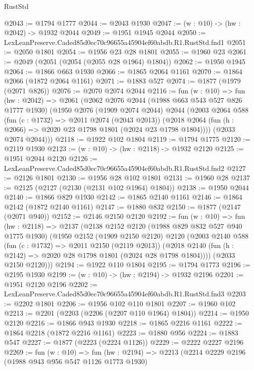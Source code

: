 \begin{lexlean}{RustStd}
\begin{coremodule}
@2043 := @1794 @1777
@2044 := @2043 @1930
@2047 := (w : @10) -> (hw : @2042) -> @1932 @2044
@2049 := @1951 @1945 @2044
@2050 := LexLeanPreserve.Caded85d0ec70c96655a45904ef60abdb.R1.RustStd.fnd1
@2051 := @2050 @1801
@2054 := @1956 @23 @28 @1801
@2055 := @1960 @23
@2061 := @2049 (@2051 (@2054 (@2055 @28 @1964) @1804))
@2062 := @1950 @1945
@2064 := @1866 @663 @1930
@2066 := @1865 @2064 @1161
@2070 := @1864 @2066 (@1872 @2064 @1161)
@2071 := @1883 @527
@2074 := @1877 (@1979 (@2071 @826))
@2076 := @2070 @2074 @2044
@2116 := fun (w : @10) =>
  fun (hw : @2042) =>
  @2061
    (@2062
      @2076
      @2044
      (@1988 @663 @543 @527 @826 @1777 @1930)
      (@1950
        @2076
        (@1909 @2074 @2044)
        @2044
        (@2003
          @2064
          @588
          (fun (c : @1732) => @2011 @2074 (@2043 @2013))
          (@2018 @2064 (fun (h : @2066) => @2020 @23 @1798 @1801 (@2024 @23 @1798 @1804))))
        (@2033 @2074 @2044)))
@2118 := @1922 @102 @1804
@2119 := @1794 @1775
@2120 := @2119 @1930
@2123 := (w : @10) -> (hw : @2118) -> @1932 @2120
@2125 := @1951 @2044 @2120
@2126 := LexLeanPreserve.Caded85d0ec70c96655a45904ef60abdb.R1.RustStd.fnd2
@2127 := @2126 @1801
@2130 := @1956 @28 @102 @1801
@2131 := @1960 @28
@2137 := @2125 (@2127 (@2130 (@2131 @102 @1964) @1804))
@2138 := @1950 @2044
@2140 := @1866 @829 @1930
@2142 := @1865 @2140 @1161
@2146 := @1864 @2142 (@1872 @2140 @1161)
@2147 := @1880 @832
@2150 := @1877 (@2147 (@2071 @940))
@2152 := @2146 @2150 @2120
@2192 := fun (w : @10) =>
  fun (hw : @2118) =>
  @2137
    (@2138
      @2152
      @2120
      (@1988 @829 @832 @527 @940 @1775 @1930)
      (@1950
        @2152
        (@1909 @2150 @2120)
        @2120
        (@2003
          @2140
          @588
          (fun (c : @1732) => @2011 @2150 (@2119 @2013))
          (@2018 @2140 (fun (h : @2142) => @2020 @28 @1798 @1801 (@2024 @28 @1798 @1804))))
        (@2033 @2150 @2120)))
@2194 := @1922 @110 @1804
@2195 := @1794 @1773
@2196 := @2195 @1930
@2199 := (w : @10) -> (hw : @2194) -> @1932 @2196
@2201 := @1951 @2120 @2196
@2202 := LexLeanPreserve.Caded85d0ec70c96655a45904ef60abdb.R1.RustStd.fnd3
@2203 := @2202 @1801
@2206 := @1956 @102 @110 @1801
@2207 := @1960 @102
@2213 := @2201 (@2203 (@2206 (@2207 @110 @1964) @1804))
@2214 := @1950 @2120
@2216 := @1866 @943 @1930
@2218 := @1865 @2216 @1161
@2222 := @1864 @2218 (@1872 @2216 @1161)
@2223 := @1880 @956
@2224 := @1883 @547
@2227 := @1877 (@2223 (@2224 @1126))
@2229 := @2222 @2227 @2196
@2269 := fun (w : @10) =>
  fun (hw : @2194) =>
  @2213
    (@2214
      @2229
      @2196
      (@1988 @943 @956 @547 @1126 @1773 @1930)

\end{coremodule}
\end{lexlean}
